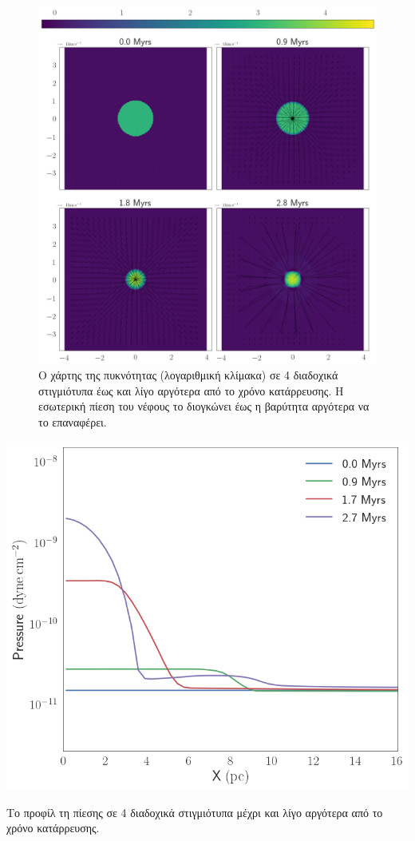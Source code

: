 \begin{figure}[h]
	\centering
	\includegraphics[width=1\linewidth]{DataImages/NoCoolGRquad}
	\caption{Ο χάρτης της πυκνότητας (λογαριθμική κλίμακα) σε 4 διαδοχικά στιγμιότυπα έως και λίγο αργότερα από το χρόνο κατάρρευσης. Η εσωτερική πίεση του νέφους το διογκώνει έως η βαρύτητα αργότερα να το επαναφέρει.}
	\label{fig:nocoolgrquad}
\end{figure}

\begin{marginfigure}
	\centering
	\includegraphics[width=1\linewidth]{DataImages/NoCoolGPRSprofile.png}
	\caption{Το προφίλ τη πίεσης σε 4 διαδοχικά στιγμιότυπα μέχρι και λίγο αργότερα από το χρόνο κατάρρευσης.}
	\label{fig:nocoolgprsprofile}
\end{marginfigure}

